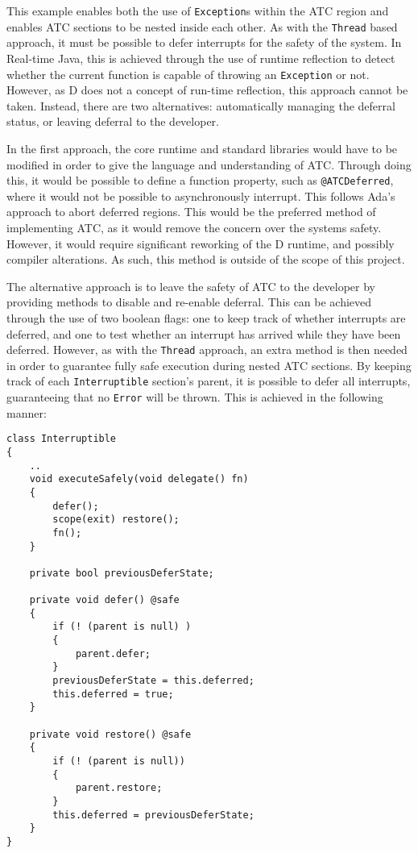 This example enables both the use of \texttt{Exception}s within the ATC region and
enables ATC sections to be nested inside each other. 
As with the \texttt{Thread} based approach, it must be possible to defer interrupts
for the safety of the system. 
In Real-time Java, this is achieved through the use of runtime reflection to detect
whether the current function is capable of throwing an \texttt{Exception} or not.
However, as D does not a concept of run-time reflection, this approach cannot be
taken. 
Instead, there are two alternatives: automatically managing the deferral
status, or leaving deferral to the developer. 
\par\bigskip\noindent
In the first approach, the core runtime and standard libraries would have to be 
modified in order to give the language and understanding of ATC. Through doing 
this, it would be possible to define a function property, such as \texttt{@ATCDeferred},  
where it would not be possible to asynchronously interrupt. This follows Ada's
approach to abort deferred regions. 
This would be the preferred method of implementing ATC, as it would remove the
concern over the systems safety. However, it would require significant
reworking of the D runtime, and possibly compiler alterations.
As such, this method is outside of the scope of this
project. 
\par\bigskip\noindent
The alternative approach is to leave the safety of ATC to the developer by
providing methods to disable and re-enable deferral.
This can be achieved through the use of two boolean flags: one to keep track
of whether interrupts are deferred, and one to test whether an interrupt has
arrived while they have been deferred. 
However, as with the \texttt{Thread} approach, an extra method is then needed in 
order to guarantee fully safe execution during nested ATC sections. By keeping
track of each \texttt{Interruptible} section's parent, it is possible to defer
all interrupts, guaranteeing that no \texttt{Error} will be thrown. This is
achieved in the following manner: 
\begin{lstlisting}[basicstyle=\small]
class Interruptible
{
    ..
    void executeSafely(void delegate() fn) 
    {
        defer();
        scope(exit) restore();
        fn();
    }

    private bool previousDeferState;

    private void defer() @safe
    {
        if (! (parent is null) )
        {
            parent.defer;
        }
        previousDeferState = this.deferred;
        this.deferred = true;
    }

    private void restore() @safe
    {
        if (! (parent is null))
        {
            parent.restore;
        }
        this.deferred = previousDeferState;
    }
}
\end{lstlisting}
